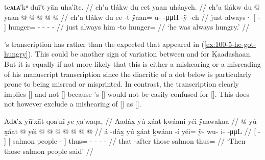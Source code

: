 \ex\label{ex:100-43-always-hungry}%
%
\begingl
	\glpreamble	tcᴀʟᴀ′kᵘ duī′t yān uha′îtc. //
	\glpreamble	chʼa tlákw du eet yaan uháaych. //
	\gla	chʼa tlákw
		{} du  @ {} {}
		yaan @  @ {} @ {} @ {} @ {} //
	\glb	chʼa tlákw
		{} du ee -t {}
		ÿaan= u-  -μμH -ÿ -ch //
	\glc	just always·
		{}[   - {}]
		hunger= -  - - - //
	\gld	just always
		{} him {} -to {}
		hunger=  {} {} {} {} //
	\glft	‘he was always hungry.’
		//
\endgl
\xe

\citeauthor{swanton:1909}’s transcription has  rather than the expected  that appeared in (\ref{ex:100-5-he-got-hungry}).
This could be another sign of variation between  and  for Ḵaadashaan.
But it is equally if not more likely that this is either a mishearing or a misreading of his manuscript transcription since the diacritic of a dot below is particularly prone to being misread or misprinted.
In contrast, the transcription  clearly implies  [] and not  [] because \citeauthor{swanton:1909}’s  [] would not be easily confused for  [].
This does not however exclude a mishearing of [] as [].

\ex\label{ex:100-44-salmon-people-said}%
%
\begingl
	\glpreamble	Adᴀ′x yū′xāt qoa′nî ye ỵa′waqa, //
	\glpreamble	Aadáx̱ yú x̱áat ḵwáani yéi ÿaawaḵaa //
	\gla	{}  @ {} {}
		{} yú x̱áat  @ {} {}
		yéi @  @ {} @ {} @ {} @ {} @ {} @ {} //
	\glb	{} á -dáx̱ {}
		{} yú x̱áat ḵwáan -í {}
		yéi= ÿ- wu- i-  -μμL //
	\glc	{}[  - {}]
		{}[  salmon people - {}]
		thus= - - -  - //
	\gld	{} that -after {}
		{} those salmon  {} {}
		thus=  {} {} {} {} //
	\glft	‘Then those salmon people said’
		//
\endgl
\xe

